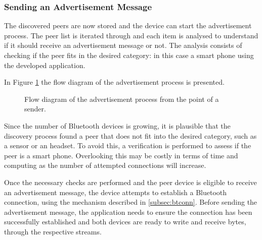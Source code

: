 \subsubsection{Sending an Advertisement Message}
\label{subsubsec:sendadv}

The discovered peers are now stored and the device can start the advertisement process. The peer list is iterated through and each item is analysed to understand if it should receive an advertisement message or not. The analysis consists of checking if the peer fits in the desired category: in this case a smart phone using the developed application.

In Figure \ref{fig:advflux} the flow diagram of the advertisement process is presented.

\begin{figure}[ht]
	\noindent{}
	\caption{\label{fig:advflux} Flow diagram of the advertisement process from the point of a sender.}
\end{figure}

Since the number of Bluetooth devices is growing, it is plausible that the discovery process found a peer that does not fit into the desired category, such as a sensor or an headset. To avoid this, a verification is performed to assess if the peer is a smart phone. Overlooking this may be costly in terms of time and computing as the number of attempted connections will increase.

Once the necessary checks are performed and the peer device is eligible to receive an advertisement message, the device attempts to establish a Bluetooth connection, using the mechanism described in \ref{subsec:btconn}. Before sending the advertisement message, the application needs to ensure the connection has been successfully established and both devices are ready to write and receive bytes, through the respective streams.


